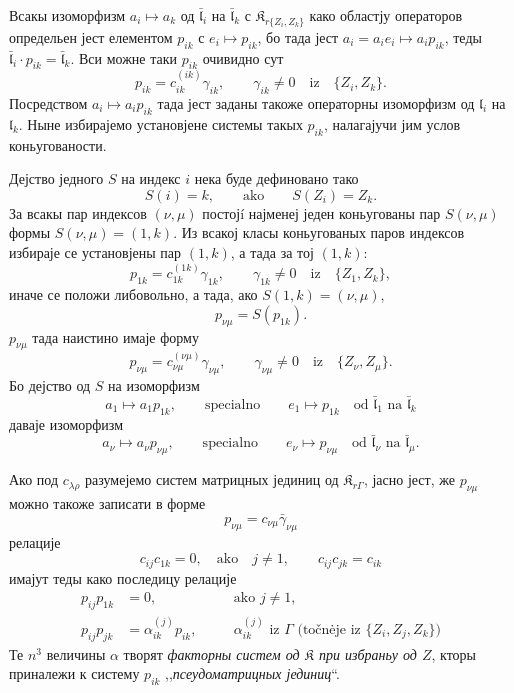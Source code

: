 \documentclass[11pt]{article}
\begin{document}
Всакы изоморфизм \(a_i\mapsto a_k\) од \(\bar{\mathfrak l}_i\) на \(\bar{\mathfrak l}_k\) с \(\mathfrak K_{r\{Z_i,Z_k\}}\) како областју операторов определьен јест елементом \(p_{ik}\) с \(e_i\mapsto p_{ik}\), бо тада јест \(a_i=a_ie_i\mapsto a_ip_{ik}\), теды \(\bar{\mathfrak l}_i\cdot p_{ik}=\bar{\mathfrak l}_k\). Вси можне таки \(p_{ik}\) очивидно сут
\[
p_{ik}=c_{ik}^{(ik)}\gamma_{ik},\qquad \gamma_{ik}\ne0\quad\text{iz}\quad \{Z_i,Z_k\}.
\]
Посредством \(a_i\mapsto a_ip_{ik}\) тада јест заданы такоже операторны изоморфизм од \(\mathfrak l_i\) на \(\mathfrak l_k\). Ныне избирајемо установјене системы такых \(p_{ik}\), налагајучи јим услов коньугованости.

Дејство једного \(S\) на индекс \(i\) нека буде дефиновано тако
\[
S(i)=k,\qquad\text{ako}\qquad S(Z_i)=Z_k.
\]
За всакы пар индексов \((\nu,\mu)\) постојí најменеј једен коньугованы пар \(S(\nu,\mu)\) формы \(S(\nu,\mu)=(1,k)\). Из всакој класы коньугованых паров индексов избираје се установјены пар \((1,k)\), а тада за тој \((1,k)\):
\[
p_{1k}=c_{1k}^{(1k)}\gamma_{1k},\qquad \gamma_{1k}\ne0\quad\text{iz}\quad \{Z_1,Z_k\},
\]
иначе се положи либовольно, а тада, ако \(S(1,k)=(\nu,\mu)\),
\[
p_{\nu\mu}=S(p_{1k}).
\]
\(p_{\nu\mu}\) тада наистино имаје форму
\[
p_{\nu\mu}=c_{\nu\mu}^{(\nu\mu)}\gamma_{\nu\mu},\qquad
\gamma_{\nu\mu}\ne0\quad\text{iz}\quad \{Z_\nu,Z_\mu\}.
\]
Бо дејство од \(S\) на изоморфизм
\[
a_1\mapsto a_1p_{1k},\qquad\text{specialno}\qquad e_1\mapsto p_{1k}
\quad\text{od }\bar{\mathfrak l}_1\text{ na }\bar{\mathfrak l}_k
\]
даваје изоморфизм
\[
a_\nu\mapsto a_\nu p_{\nu\mu},\qquad\text{specialno}\qquad e_\nu\mapsto p_{\nu\mu}
\quad\text{od }\bar{\mathfrak l}_\nu\text{ na }\bar{\mathfrak l}_\mu.
\]

Ако под \(c_{\lambda\rho}\) разумејемо систем матрицных јединиц од \(\mathfrak K_{r\Gamma}\), јасно јест, же \(p_{\nu\mu}\) можно такоже записати в форме
\[
p_{\nu\mu}=c_{\nu\mu}\bar\gamma_{\nu\mu}
\]
релације
\[
c_{ij}c_{1k}=0,\quad\text{ako}\quad j\ne1,
\qquad
c_{ij}c_{jk}=c_{ik}
\]
имајут теды како последицу релације
\[
\begin{aligned}
p_{ij}p_{1k}&=0,\quad &&\text{ako }j\ne1,\\
p_{ij}p_{jk}&=\alpha_{ik}^{(j)}p_{ik},\quad
&&\alpha_{ik}^{(j)}\text{ iz }\Gamma\text{ (točnėje iz }\{Z_i,Z_j,Z_k\}\text{)}
\end{aligned}
\]
Те \(n^3\) величины \(\alpha\) творят \emph{факторны систем од \(\mathfrak K\) при избраньу од \(Z\)}, кторы приналежи к систему \(p_{ik}\) ,,\emph{псеудоматрицных јединиц}``.
\end{document}
